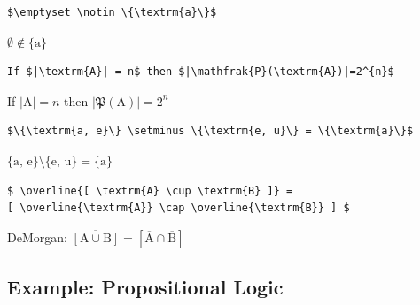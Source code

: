 \begin{frame}[fragile]

{\small
\begin{lstlisting}
$\emptyset \notin \{\textrm{a}\}$
\end{lstlisting}
}

\ea $\emptyset \notin \{\textrm{a}\}$
\z 


{\small
\begin{lstlisting}
If $|\textrm{A}| = n$ then $|\mathfrak{P}(\textrm{A})|=2^{n}$
\end{lstlisting}
}

\ea If $|\textrm{A}| = n$ then $|\mathfrak{P}(\textrm{A})|=2^{n}$
\z 


{\small
\begin{lstlisting}
$\{\textrm{a, e}\} \setminus \{\textrm{e, u}\} = \{\textrm{a}\}$
\end{lstlisting}
}

\ea $\{\textrm{a, e}\} \setminus \{\textrm{e, u}\} = \{\textrm{a}\}$
\z 

{\small
\begin{lstlisting}
$ \overline{[ \textrm{A} \cup \textrm{B} ]} = 
[ \overline{\textrm{A}} \cap \overline{\textrm{B}} ] $
\end{lstlisting}
}

\ea DeMorgan:
$ \overline{[ \textrm{A} \cup \textrm{B} ]} = 
[ \overline{\textrm{A}} \cap \overline{\textrm{B}} ] $
\z 


\end{frame}


\subsection{Example: Propositional Logic}

